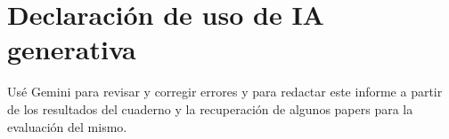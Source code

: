 \section*{Declaración de uso de IA generativa}
{\footnotesize Usé Gemini para revisar y corregir errores y para redactar este informe a partir de los resultados del cuaderno y la recuperación de algunos papers para la evaluación del mismo.}
